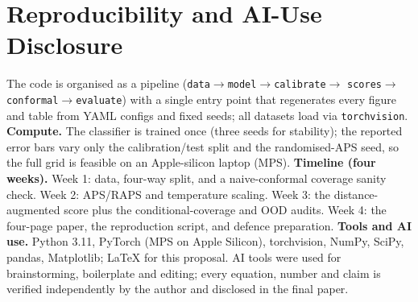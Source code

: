\documentclass{article}
\begin{document}
\section{Reproducibility and AI-Use Disclosure}
The code is organised as a pipeline (\texttt{data}$\to$\texttt{model}$\to$\texttt{calibrate}$\to$
\texttt{scores}$\to$\texttt{conformal}$\to$\texttt{evaluate}) with a single entry point that
regenerates every figure and table from YAML configs and fixed seeds; all datasets load via
\texttt{torchvision}. \textbf{Compute.} The classifier is trained once (three seeds for stability);
the reported error bars vary only the calibration/test split and the randomised-APS seed, so the full
grid is feasible on an Apple-silicon laptop (MPS). \textbf{Timeline (four weeks).} Week 1: data,
four-way split, and a naive-conformal coverage sanity check. Week 2: APS/RAPS and temperature
scaling. Week 3: the distance-augmented score plus the conditional-coverage and OOD audits. Week 4:
the four-page paper, the reproduction script, and defence preparation. \textbf{Tools and AI use.}
Python 3.11, PyTorch (MPS on Apple Silicon), torchvision, NumPy, SciPy, pandas, Matplotlib; \LaTeX{}
for this proposal. AI tools were used for brainstorming, boilerplate and editing; every equation,
number and claim is verified independently by the author and disclosed in the final paper.
\end{document}
